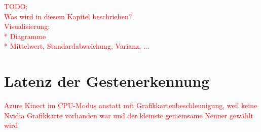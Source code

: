 















\textcolor{red}{TODO:\\
Was wird in diesem Kapitel beschrieben?\\
Visualisierung:\\
* Diagramme\\
* Mittelwert, Standardabweichung, Varianz, ...
}







\section{Latenz der Gestenerkennung}
\textcolor{red}{Azure Kinect im CPU-Modus anstatt mit Grafikkartenbeschleunigung, weil keine Nvidia Grafikkarte vorhanden war und der kleinste gemeinsame Nenner gewählt wird}

